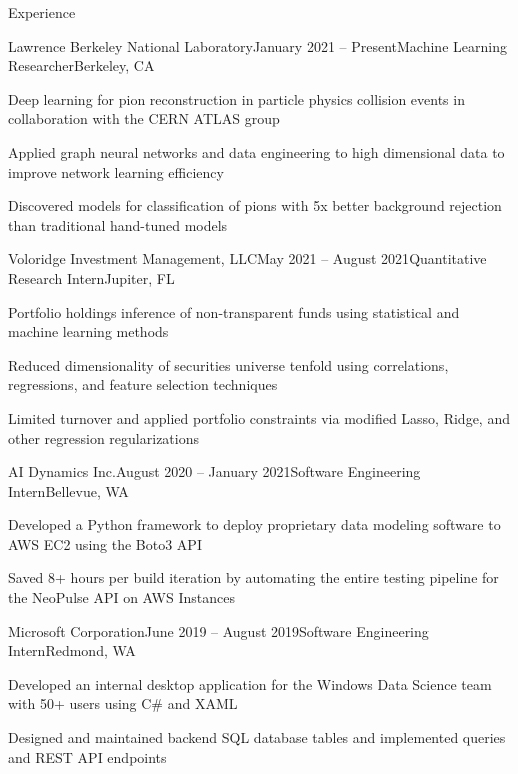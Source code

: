 \documentclass{resume} %
\begin{document}
\begin{rSection}{Experience}

\begin{rSubsection}{Lawrence Berkeley National Laboratory}{January 2021 – Present}{Machine Learning Researcher}{Berkeley, CA}
    \item Deep learning for pion reconstruction in particle physics collision events in collaboration with the CERN ATLAS group
    \item Applied graph neural networks and data engineering to high dimensional data to improve network learning efficiency
    \item Discovered models for classification of pions with 5x better background rejection than traditional hand-tuned models
\end{rSubsection}

\begin{rSubsection}{Voloridge Investment Management, LLC}{May 2021 – August 2021}{Quantitative Research Intern}{Jupiter, FL}
    \item Portfolio holdings inference of non-transparent funds using statistical and machine learning methods
    \item Reduced dimensionality of securities universe tenfold using correlations, regressions, and feature selection techniques
    \item Limited turnover and applied portfolio constraints via modified Lasso, Ridge, and other regression regularizations
\end{rSubsection}

\begin{rSubsection}{AI Dynamics Inc.}{August 2020 – January 2021}{Software Engineering Intern}{Bellevue, WA}
    \item Developed a Python framework to deploy proprietary data modeling software to AWS EC2 using the Boto3 API
    \item Saved 8+ hours per build iteration by automating the entire testing pipeline for the NeoPulse API on AWS Instances
\end{rSubsection}

\begin{rSubsection}{Microsoft Corporation}{June 2019 – August 2019}{Software Engineering Intern}{Redmond, WA}
    \item Developed an internal desktop application for the Windows Data Science team with 50+ users using C\# and XAML
    \item Designed and maintained backend SQL database tables and implemented queries and REST API endpoints
\end{rSubsection}


\end{rSection}
\end{document}
